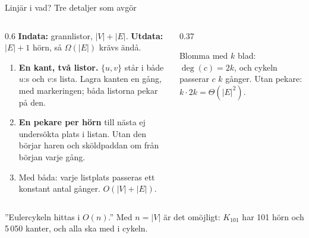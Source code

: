 \begin{frame}{Linjär i vad? Tre detaljer som avgör}
\begin{columns}[T]
\begin{column}{0.6\textwidth}
\footnotesize
\textbf{Indata:} grannlistor, $|V|+|E|$. \textbf{Utdata:} $|E|+1$ hörn, så $\Omega(|E|)$ krävs ändå.
\begin{enumerate}\setlength{\itemsep}{2pt}
  \item \textbf{En kant, två listor.} $\{u,v\}$ står i både $u$:s och $v$:s lista. Lagra kanten
        en gång, med markeringen; båda listorna pekar på den.
  \item \textbf{En pekare per hörn} till nästa ej undersökta plats i listan. Utan den börjar
        haren och sköldpaddan om från början varje gång.
  \item Med båda: varje listplats passeras ett konstant antal gånger. $O(|V|+|E|)$.
\end{enumerate}
\end{column}
\begin{column}{0.37\textwidth}
\centering
{}\par
\footnotesize Blomma med $k$ blad: $\deg(c)=2k$, och cykeln passerar $c$ $k$ gånger.
Utan pekare: $k\cdot2k=\Theta(|E|^2)$.
\end{column}
\end{columns}
\vfill
\begin{missbox}[fontupper=\footnotesize]
”Eulercykeln hittas i $O(n)$.” Med $n=|V|$ är det omöjligt: $K_{101}$ har 101 hörn och
5\,050 kanter, och alla ska med i cykeln.
\end{missbox}
\end{frame}

